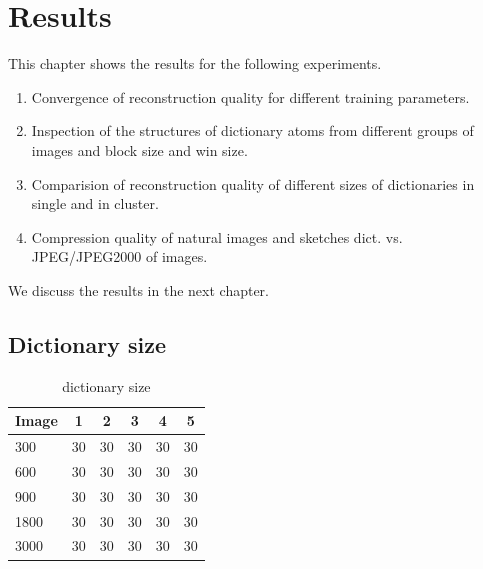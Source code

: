 \chapter{Results}
This chapter shows the results for the following experiments.

\begin{enumerate}
Reconstruction quality is mean of PSNR of images inside and outside of the
training sets.
 \item Convergence of reconstruction quality for different training parameters.
 \item Inspection of the structures of dictionary atoms from different
groups of images and block size and win size.
 \item Comparision of reconstruction quality of different sizes of dictionaries
in single and in cluster. 
 \item Compression quality of natural images and sketches dict. vs.
JPEG/JPEG2000 of images.
\end{enumerate}

We discuss the results in the next chapter.


\section{Dictionary size}
\begin{table}[h]
\caption{dictionary size}
\centering
\begin{tabular}{l  c  c  c  c  c}
\toprule
Image & 1 & 2 & 3 & 4 & 5 \\
\hline
300 & 30 & 30 & 30 & 30 & 30 \\
600 & 30 & 30 & 30 & 30 & 30 \\
900 & 30 & 30 & 30 & 30 & 30 \\
1800 & 30 & 30 & 30 & 30 & 30 \\
3000 & 30 & 30 & 30 & 30 & 30 \\
\bottomrule
\end{tabular}
\end{table}

